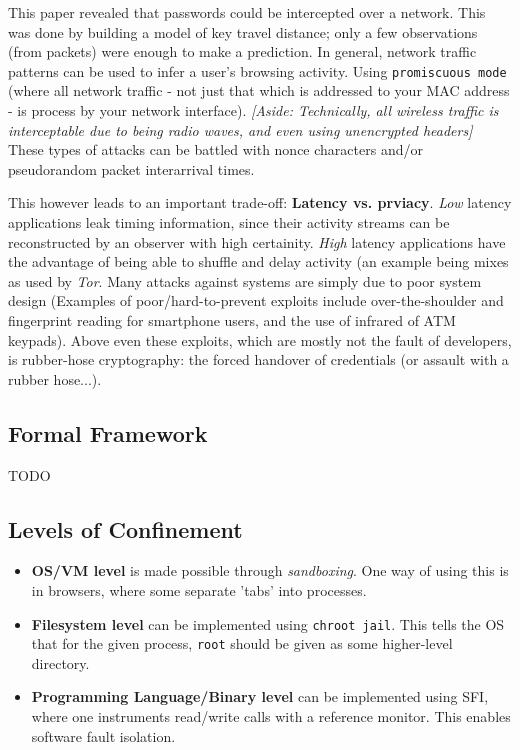 \documentclass[twoside]{article}
\begin{document}
This paper revealed that passwords could be intercepted over a network. This was done by building a model of key travel distance; only a few observations (from packets) were enough to make a prediction. In general, network traffic patterns can be used to infer a user's browsing activity. Using \texttt{promiscuous mode} (where all network traffic - not just that which is addressed to your MAC address - is process by your network interface). \textit{[Aside: Technically, all wireless traffic is interceptable due to being radio waves, and even using unencrypted headers]} These types of attacks can be battled with nonce characters and/or pseudorandom packet interarrival times.

This however leads to an important trade-off: \textbf{Latency vs. prviacy}. \textit{Low} latency applications leak timing information, since their activity streams can be reconstructed by an observer with high certainity. \textit{High} latency applications have the advantage of being able to shuffle and delay activity (an example being mixes as used by \textit{Tor}.
Many attacks against systems are simply due to poor system design (Examples of poor/hard-to-prevent exploits include over-the-shoulder and fingerprint reading for smartphone users, and the use of infrared of ATM keypads). Above even these exploits, which are mostly not the fault of developers, is rubber-hose cryptography: the forced handover of credentials (or assault with a rubber hose...).

\subsection{Formal Framework}

TODO

\subsection{Levels of Confinement}

\begin{itemize}
\item \textbf{OS/VM level} is made possible through \textit{sandboxing}. One way of using this is in browsers, where some separate 'tabs' into processes.
\item \textbf{Filesystem level} can be implemented using \texttt{chroot jail}. This tells the OS that for the given process, \texttt{root} should be given as some higher-level directory.
\item \textbf{Programming Language/Binary level} can be implemented using \textsc{SFI}, where one instruments read/write calls with a reference monitor. This enables software fault isolation.
\end{itemize}
\end{document}
